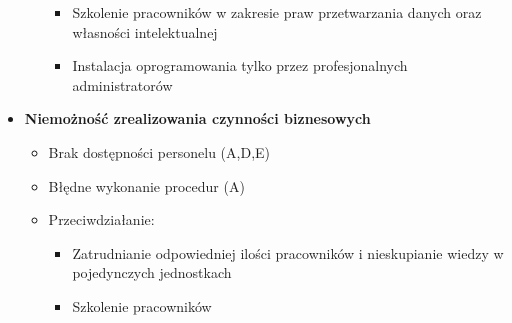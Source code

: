 \begin{itemize}
\begin{itemize}
\begin{itemize}
			\item Szkolenie pracowników w zakresie praw przetwarzania danych oraz własności intelektualnej
			\item Instalacja oprogramowania tylko przez profesjonalnych administratorów
		\end{itemize}
	\end{itemize}
	\item \textbf{Niemożność zrealizowania czynności biznesowych}
	\begin{itemize}
		\item Brak dostępności personelu (A,D,E)
		\item Błędne wykonanie procedur (A)
		\item Przeciwdziałanie:
		\begin{itemize}
			\item Zatrudnianie odpowiedniej ilości pracowników i nieskupianie wiedzy w pojedynczych jednostkach
			\item Szkolenie pracowników
		\end{itemize}
	\end{itemize}
\end{itemize}
